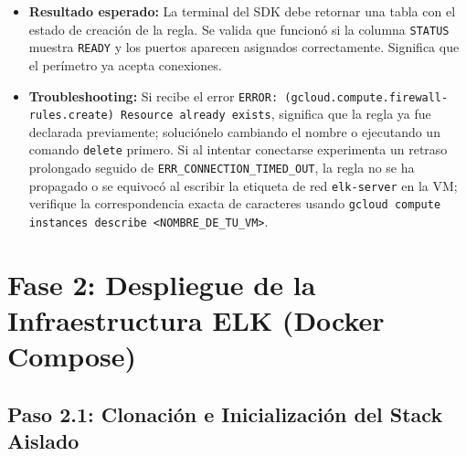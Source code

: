 \documentclass[
  coursetitle={Cómputo Nube y Tecnologías Emergentes},
  coursehours={96},
  coursedate={Verano 2026},
  doctype={Guía de Laboratorio Práctico},
  otherlangs={english,french},
  authorname={Lázaro},
  authorsurname={Bustio-Martínez},
  authortitle={PhD},
  role={Profesor Investigador},
  email={lbustio@inaoe.mx},
  phone={5559504000},
  ext={7459},
  institution={Instituto Nacional de Astrofísica, Óptica y Electrónica (INAOE)},
  department={Maestría en Ciencias en Tecnologías de Seguridad},
  address={Luis Enrique Erro 1, Sta. Ma. Tonantzintla, San Andrés Cholula, CP 72840, Puebla, México},
  margin={0.5in}
]{../../lbustio_lecture_notes}
\begin{document}
\begin{itemize}
    \item \textbf{Resultado esperado:} La terminal del SDK debe retornar una tabla con el estado de creación de la regla. Se valida que funcionó si la columna \texttt{STATUS} muestra \texttt{READY} y los puertos aparecen asignados correctamente. Significa que el perímetro ya acepta conexiones.
    
    \item \textbf{Troubleshooting:} Si recibe el error \texttt{ERROR: (gcloud.compute.firewall-rules.create) Resource already exists}, significa que la regla ya fue declarada previamente; soluciónelo cambiando el nombre o ejecutando un comando \texttt{delete} primero. Si al intentar conectarse experimenta un retraso prolongado seguido de \texttt{ERR\_CONNECTION\_TIMED\_OUT}, la regla no se ha propagado o se equivocó al escribir la etiqueta de red \texttt{elk-server} en la VM; verifique la correspondencia exacta de caracteres usando \texttt{gcloud compute instances describe <NOMBRE\_DE\_TU\_VM>}.
\end{itemize}

\section{Fase 2: Despliegue de la Infraestructura ELK (Docker Compose)}

\subsection{Paso 2.1: Clonación e Inicialización del Stack Aislado}
\end{document}
